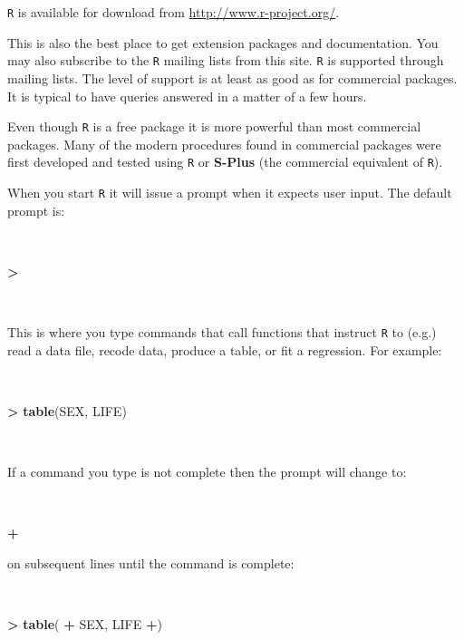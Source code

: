 \documentclass[12pt,a4paper]{book}
\newenvironment{Shaded}{\begin{snugshade}}{\end{snugshade}}
\newcommand{\KeywordTok}[1]{\textcolor[rgb]{0.13,0.29,0.53}{\textbf{#1}}}
\newcommand{\NormalTok}[1]{#1}
\newcommand{\OperatorTok}[1]{\textcolor[rgb]{0.81,0.36,0.00}{\textbf{#1}}}
\newcommand{\StringTok}[1]{\textcolor[rgb]{0.31,0.60,0.02}{#1}}
\theoremstyle{definition}
\theoremstyle{definition}
\theoremstyle{definition}
\theoremstyle{remark}
\begin{document}
\texttt{R} is available for download from
\url{http://www.r-project.org/}.

This is also the best place to get extension packages and documentation.
You may also subscribe to the \texttt{R} mailing lists from this site.
\texttt{R} is supported through mailing lists. The level of support is
at least as good as for commercial packages. It is typical to have
queries answered in a matter of a few hours.

Even though \texttt{R} is a free package it is more powerful than most
commercial packages. Many of the modern procedures found in commercial
packages were first developed and tested using \texttt{R} or
\textbf{S-Plus} (the commercial equivalent of \texttt{R}).

When you start \texttt{R} it will issue a prompt when it expects user
input. The default prompt is:

~

\begin{Shaded}
\begin{Highlighting}[]
\OperatorTok{>}
\end{Highlighting}
\end{Shaded}

~

This is where you type commands that call functions that instruct
\texttt{R} to (e.g.) read a data file, recode data, produce a table, or
fit a regression. For example:

~

\begin{Shaded}
\begin{Highlighting}[]
\OperatorTok{>}\StringTok{ }\KeywordTok{table}\NormalTok{(SEX, LIFE)}
\end{Highlighting}
\end{Shaded}

~

If a command you type is not complete then the prompt will change to:

~

\begin{Shaded}
\begin{Highlighting}[]
\OperatorTok{+}
\end{Highlighting}
\end{Shaded}

\newpage

on subsequent lines until the command is complete:

~

\begin{Shaded}
\begin{Highlighting}[]
\OperatorTok{>}\StringTok{ }\KeywordTok{table}\NormalTok{(}
\OperatorTok{+}\StringTok{ }\NormalTok{SEX, LIFE }\OperatorTok{+}\NormalTok{)}
\end{Highlighting}
\end{Shaded}
\end{document}
